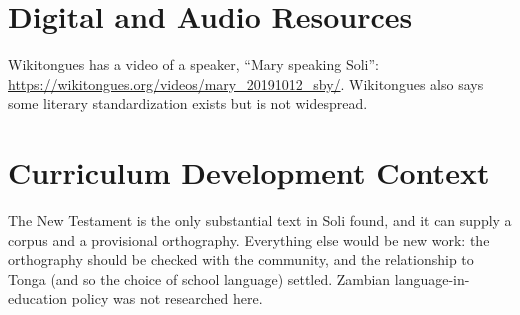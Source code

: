 \documentclass[12pt]{article}
\begin{document}
\section{Digital and Audio Resources}
Wikitongues has a video of a speaker, ``Mary speaking Soli'': \url{https://wikitongues.org/videos/mary_20191012_sby/}. Wikitongues also says some literary standardization exists but is not widespread.

\section{Curriculum Development Context}
The New Testament is the only substantial text in Soli found, and it can supply a corpus and a provisional orthography. Everything else would be new work: the orthography should be checked with the community, and the relationship to Tonga (and so the choice of school language) settled. Zambian language-in-education policy was not researched here.
\end{document}
